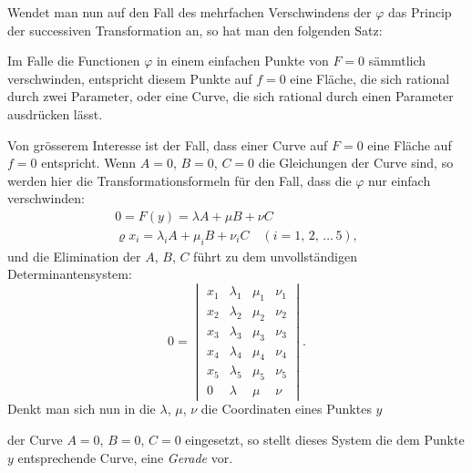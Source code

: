 \documentclass{article}
\begin{document}
Wendet man nun auf den Fall des mehrfachen Verschwindens der $\varphi$ das Princip der successiven Transformation an, so hat man den folgenden Satz:

Im Falle die Functionen $\varphi$ in einem einfachen Punkte von $F = 0$ sämmtlich verschwinden, entspricht diesem Punkte auf $f = 0$ eine Fläche, die sich rational durch zwei Parameter, oder eine Curve, die sich rational durch einen Parameter ausdrücken lässt.

Von grösserem Interesse ist der Fall, dass einer Curve auf $F = 0$ eine Fläche auf $f = 0$ entspricht. Wenn $A = 0$, $B = 0$, $C = 0$ die Gleichungen der Curve sind, so werden hier die Transformationsformeln für den Fall, dass die $\varphi$ nur einfach verschwinden:
\[
\begin{gathered}
0 = F(y) = \lambda A + \mu B + \nu C \\
\varrho x_i = \lambda_i A + \mu_i B + \nu_i C \quad (i = 1,\, 2,\, \dots\, 5),
\end{gathered}
\]
und die Elimination der $A$, $B$, $C$ führt zu dem unvollständigen Determinantensystem:
\[
0 =
\begin{vmatrix}
x_1 & \lambda_1 & \mu_1 & \nu_1 \\
x_2 & \lambda_2 & \mu_2 & \nu_2 \\
x_3 & \lambda_3 & \mu_3 & \nu_3 \\
x_4 & \lambda_4 & \mu_4 & \nu_4 \\
x_5 & \lambda_5 & \mu_5 & \nu_5 \\
0 & \lambda & \mu & \nu
\end{vmatrix} .
\]
Denkt man sich nun in die $\lambda$, $\mu$, $\nu$ die Coordinaten eines Punktes $y$

der Curve $A = 0$, $B = 0$, $C = 0$ eingesetzt, so stellt dieses System die dem Punkte $y$ entsprechende Curve, eine \emph{Gerade} vor.
\end{document}
